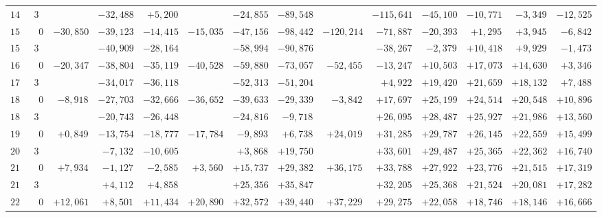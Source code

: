 \begin{landscape}
\begin{longtable}{@{}rr|r|r|r|r|r|r|r|r|r|r|r|r@{}}
\(142\) & \(30\) &  & \(-32{,}488\) & \(+5{,}200\) &  & \(-24{,}855\) & \(-89{,}548\) &  & \(-115{,}641\) & \(-45{,}100\) & \(-10{,}771\) & \(-3{,}349\) & \(-12{,}525\)\\[2pt]
\(150\) & \(0\) & \(-30{,}850\) & \(-39{,}123\) & \(-14{,}415\) & \(-15{,}035\) & \(-47{,}156\) & \(-98{,}442\) & \(-120{,}214\) & \(-71{,}887\) & \(-20{,}393\) & \(+1{,}295\) & \(+3{,}945\) & \(-6{,}842\)\\
\(157\) & \(30\) &  & \(-40{,}909\) & \(-28{,}164\) &  & \(-58{,}994\) & \(-90{,}876\) &  & \(-38{,}267\) & \(-2{,}379\) & \(+10{,}418\) & \(+9{,}929\) & \(-1{,}473\)\\
\(165\) & \(0\) & \(-20{,}347\) & \(-38{,}804\) & \(-35{,}119\) & \(-40{,}528\) & \(-59{,}880\) & \(-73{,}057\) & \(-52{,}455\) & \(-13{,}247\) & \(+10{,}503\) & \(+17{,}073\) & \(+14{,}630\) & \(+3{,}346\)\\
\(172\) & \(30\) &  & \(-34{,}017\) & \(-36{,}118\) &  & \(-52{,}313\) & \(-51{,}204\) &  & \(+4{,}922\) & \(+19{,}420\) & \(+21{,}659\) & \(+18{,}132\) & \(+7{,}488\)\\[2pt]
\(180\) & \(0\) & \(-8{,}918\) & \(-27{,}703\) & \(-32{,}666\) & \(-36{,}652\) & \(-39{,}633\) & \(-29{,}339\) & \(-3{,}842\) & \(+17{,}697\) & \(+25{,}199\) & \(+24{,}514\) & \(+20{,}548\) & \(+10{,}896\)\\
\(187\) & \(30\) &  & \(-20{,}743\) & \(-26{,}448\) &  & \(-24{,}816\) & \(-9{,}718\) &  & \(+26{,}095\) & \(+28{,}487\) & \(+25{,}927\) & \(+21{,}986\) & \(+13{,}560\)\\
\(195\) & \(0\) & \(+0{,}849\) & \(-13{,}754\) & \(-18{,}777\) & \(-17{,}784\) & \(-9{,}893\) & \(+6{,}738\) & \(+24{,}019\) & \(+31{,}285\) & \(+29{,}787\) & \(+26{,}145\) & \(+22{,}559\) & \(+15{,}499\)\\
\(202\) & \(30\) &  & \(-7{,}132\) & \(-10{,}605\) &  & \(+3{,}868\) & \(+19{,}750\) &  & \(+33{,}601\) & \(+29{,}487\) & \(+25{,}365\) & \(+22{,}362\) & \(+16{,}740\)\\[2pt]
\(210\) & \(0\) & \(+7{,}934\) & \(-1{,}127\) & \(-2{,}585\) & \(+3{,}560\) & \(+15{,}737\) & \(+29{,}382\) & \(+36{,}175\) & \(+33{,}788\) & \(+27{,}922\) & \(+23{,}776\) & \(+21{,}515\) & \(+17{,}319\)\\
\(217\) & \(30\) &  & \(+4{,}112\) & \(+4{,}858\) &  & \(+25{,}356\) & \(+35{,}847\) &  & \(+32{,}205\) & \(+25{,}368\) & \(+21{,}524\) & \(+20{,}081\) & \(+17{,}282\)\\
\(225\) & \(0\) & \(+12{,}061\) & \(+8{,}501\) & \(+11{,}434\) & \(+20{,}890\) & \(+32{,}572\) & \(+39{,}440\) & \(+37{,}229\) & \(+29{,}275\) & \(+22{,}058\) & \(+18{,}746\) & \(+18{,}146\) & \(+16{,}666\)\\

\end{longtable}
\end{landscape}

